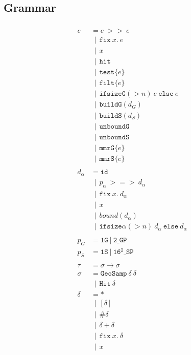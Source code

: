 \documentclass{article}
\newcommand {\gbar} {~~|~~}
\newcommand {\chain}{\mathtt{>>}}
\newcommand {\rightFish}{\mathtt{>=>}}
\newcommand {\fix}{\mathtt{fix}}
\newcommand {\test}{\mathtt{test}}
\newcommand {\filt}{\mathtt{filt}}
\newcommand {\isect}{\mathtt{hit}}
\newcommand {\buildG}{\mathtt{buildG}}
\newcommand {\buildS}{\mathtt{buildS}}
\newcommand {\unboundG}{\mathtt{unboundG}}
\newcommand {\unboundS}{\mathtt{unboundS}}
\newcommand {\mmrG}{\mathtt{mmrG}}
\newcommand {\mmrS}{\mathtt{mmrS}}
\newcommand {\oneS}{\mathtt{1S}}
\newcommand {\oneG}{\mathtt{1G}}
\newcommand {\sampP}{\mathtt{16^2\_SP}}
\newcommand {\twoGP}{\mathtt{2\_GP}}
\newcommand {\geosamp}{\mathtt{GeoSamp}}
\newcommand {\hit}{\mathtt{Hit}}
\newcommand {\bound}{\mathit{bound}}
\begin{document}
\subsection{Grammar}
\begin{align*}
\\
e &= e~\chain~e \\
&\gbar \fix~x.~e \\
&\gbar x \\
&\gbar \isect \\
&\gbar \test \{ e \} \\
&\gbar \filt \{ e \} \\
&\gbar \mathtt{ifsizeG}(>n)~e \mathtt{~else~} e \\
&\gbar \buildG ( d_G ) \\
&\gbar \buildS ( d_S ) \\
&\gbar \unboundG \\
&\gbar \unboundS \\
&\gbar \mmrG \{ e \} \\
&\gbar \mmrS \{ e \} \\
\\
d_\alpha &= \mathtt{id} \\
&\gbar p_\alpha~\rightFish~d_\alpha \\
&\gbar \fix~x.~d_\alpha \\
&\gbar x \\
&\gbar \bound (d_\alpha) \\
&\gbar \mathtt{ifsize\alpha}(>n)~d_\alpha \mathtt{~else~} d_\alpha \\
\\
p_G &= \oneG~|~\twoGP \\
p_S &= \oneS~|~\sampP \\
\\
\tau &= \sigma \to \sigma \\
\sigma &= \geosamp~\delta~\delta \\
&\gbar \hit~\delta \\
\delta &= * \\
&\gbar [\delta] \\
&\gbar \# \delta \\
&\gbar \delta + \delta \\
&\gbar \fix~x.~\delta \\
&\gbar x \\
\end{align*}
\end{document}
